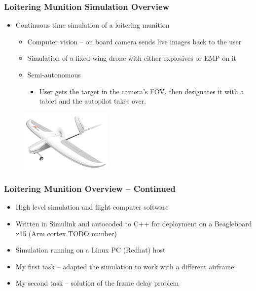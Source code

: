 \documentclass[aspectratio=169]{beamer}
\begin{document}
\begin{frame}
  \frametitle{Loitering Munition Simulation Overview}
  \begin{itemize}
  \item Continuous time simulation of a loitering munition
    \begin{itemize}
    \item Computer vision -- on board camera sends live images back to the user
    \item Simulation of a fixed wing drone with either explosives or EMP on it
    \item Semi-autonomous
      \begin{itemize}
      \item User gets the target in the camera's FOV, then designates
        it with a tablet and the autopilot takes over.
      \end{itemize}
    \end{itemize}
  \end{itemize}
    \begin{figure}
      \includegraphics[width=0.4\textwidth]{Firebird-FPV-Fixed-Wing-Drone.jpg}
    \end{figure}
\end{frame}

\begin{frame}
  \frametitle {Loitering Munition Overview -- Continued}
  \begin{itemize}
  \item High level simulation and flight computer software 
  \item Written in Simulink and autocoded to C++ for deployment on a Beagleboard x15 (Arm cortex TODO number)
  \item Simulation running on a Linux PC (Redhat) host
  \item My first task -- adapted the simulation to work with a different airframe
  \item My second task -- solution of the frame delay problem
  \end{itemize}
\end{frame}
\end{document}
